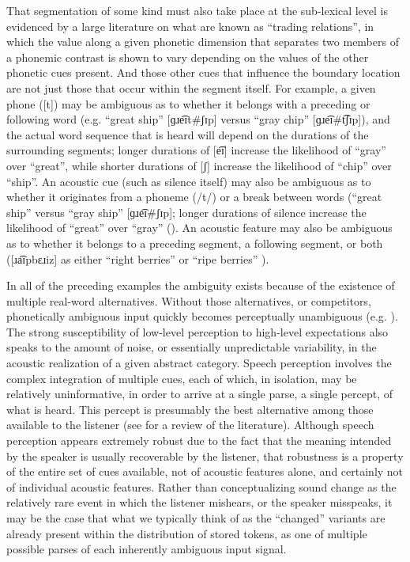 That segmentation of some kind must also take place at the sub-lexical
level is evidenced by a large literature on what are known as “trading
relations”, in which the value along a given phonetic dimension
that separates two members of a phonemic contrast is shown to vary
depending on the values of the other phonetic cues present. And those
other cues that influence the boundary location are not just those
that occur within the segment itself. For example, a given phone ({[t]})
may be ambiguous as to whether it belongs with a preceding or following
word (e.g. “great ship” {[}{ɡɹe͡ɪt}\#{ʃɪp}{]}
versus “gray chip” {[}{ɡɹe͡ɪ}\#{t͡ʃɪp}{]}),
and the actual word sequence that is heard will depend on the durations
of the surrounding segments; longer durations of {[e͡ɪ]}
increase the likelihood of “gray” over “great”, while
shorter durations of {[ʃ]} increase the likelihood of “chip”
over “ship”. An acoustic cue (such as silence itself) may also
be ambiguous as to whether it originates from a phoneme ({/t/})
or a break between words (“great ship” versus “gray ship”
{[}{ɡɹe͡ɪ}\#{ʃɪp}{]}; longer durations of silence
increase the likelihood of “great” over “gray” (\citealt{repp1978perceptual}).
An acoustic feature may also be ambiguous as to whether it belongs
to a preceding segment, a following segment, or both ({[}{ɹa͡ɪpbɛɹiz}{]}
as either “right berries” or “ripe berries” \citealt{Gow2003}). 

In all of the preceding examples the ambiguity exists because of the
existence of multiple real-word alternatives. Without those alternatives,
or competitors, phonetically ambiguous input quickly becomes perceptually
unambiguous (e.g. \citealp{warren1970perceptual,ganong1980phonetic}).
The strong susceptibility of low-level perception to high-level expectations
also speaks to the amount of noise, or essentially unpredictable variability,
in the acoustic realization of a given abstract category. Speech perception
involves the complex integration of multiple cues, each of which,
in isolation, may be relatively uninformative, in order to arrive
at a single parse, a single percept, of what is heard. This percept
is presumably the best alternative among those available to the listener
(see \citet{davis2007hearing} for a review of the literature). Although
speech perception appears extremely robust due to the fact that the
meaning intended by the speaker is usually recoverable by the listener,
that robustness is a property of the entire set of cues available,
not of acoustic features alone, and certainly not of individual acoustic
features. Rather than conceptualizing sound change as the relatively
rare event in which the listener mishears, or the speaker misspeaks,
it may be the case that what we typically think of as the “changed”
variants are already present within the distribution of stored tokens,
as one of multiple possible parses of each inherently ambiguous input
signal.

